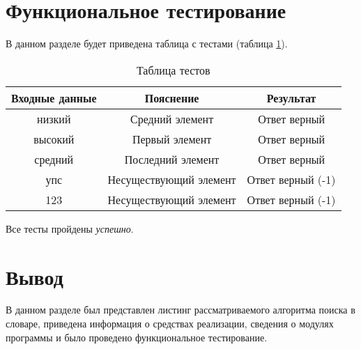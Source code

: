 \section{Функциональное тестирование}

В данном разделе будет приведена таблица с тестами (таблица \ref{table:ref1}).
\begin{center}
	\captionsetup{justification=raggedright,singlelinecheck=off}
	\begin{table}[ht]
		\centering
		\caption{Таблица тестов}
		\label{table:ref1}
		\begin{tabular}{ |c|c|c|}
			\hline
			Входные данные    & Пояснение   	  & Результат    \\ 
			\hline
			низкий			  & Средний элемент   & Ответ верный \\ \hline
			высокий 			  & Первый элемент    & Ответ верный \\ \hline
			средний 		  & Последний элемент & Ответ верный \\ \hline
			упс & Несуществующий элемент & Ответ верный (-1) \\ \hline
			123 & Несуществующий элемент & Ответ верный (-1) \\ \hline
		\end{tabular}
	\end{table}
\end{center}
Все тесты пройдены \textit{успешно}.


\section{Вывод}
В данном разделе был представлен листинг рассматриваемого алгоритма поиска в словаре, приведена информация о средствах реализации, сведения о модулях программы и было проведено функциональное тестирование.